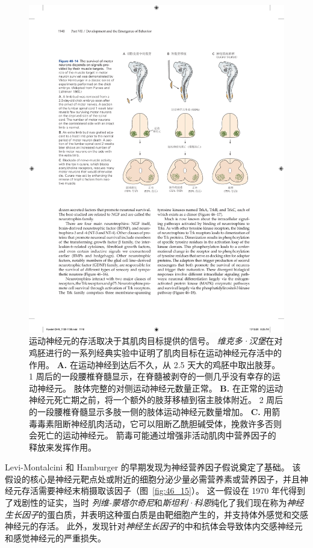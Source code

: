 \begin{figure}[htbp]
	\centering
	\includegraphics[width=0.7\linewidth]{chap46/fig_46_14}
	\caption{运动神经元的存活取决于其肌肉目标提供的信号。
		\textit{维克多·汉堡}在对鸡胚进行的一系列经典实验中证明了肌肉目标在运动神经元存活中的作用\cite{purves1985principles}。
		\textbf{A.} 在运动神经到达后不久，从 2.5 天大的鸡胚中取出肢芽。
		1 周后的一段腰椎脊髓显示，在脊髓被剥夺的一侧几乎没有幸存的运动神经元。
		肢体完整的对侧运动神经元数量正常。
		\textbf{B.} 在正常的运动神经元死亡期之前，将一个额外的肢芽移植到宿主肢体附近。
		2 周后的一段腰椎脊髓显示多肢一侧的肢体运动神经元数量增加。
		\textbf{C.} 用箭毒毒素阻断神经肌肉活动，它可以阻断乙酰胆碱受体，挽救许多否则会死亡的运动神经元。
		箭毒可能通过增强非活动肌肉中营养因子的释放来发挥作用。}
	\label{fig:46_14}
\end{figure}


Levi-Montalcini 和 Hamburger 的早期发现为神经营养因子假说奠定了基础。
该假设的核心是神经元靶点处或附近的细胞分泌少量必需营养素或营养因子，并且神经元存活需要神经末梢摄取该因子（图~\ref{fig:46_15}）。
这一假设在 1970 年代得到了戏剧性的证实，当时 \textit{列维-蒙塔尔奇尼}和\textit{斯坦利·科恩}纯化了我们现在称为\textit{神经生长因子}的蛋白质，并表明这种蛋白质是由靶细胞产生的，并支持体外感觉和交感神经元的存活。
此外，发现针对\textit{神经生长因子}的中和抗体会导致体内交感神经元和感觉神经元的严重损失。


